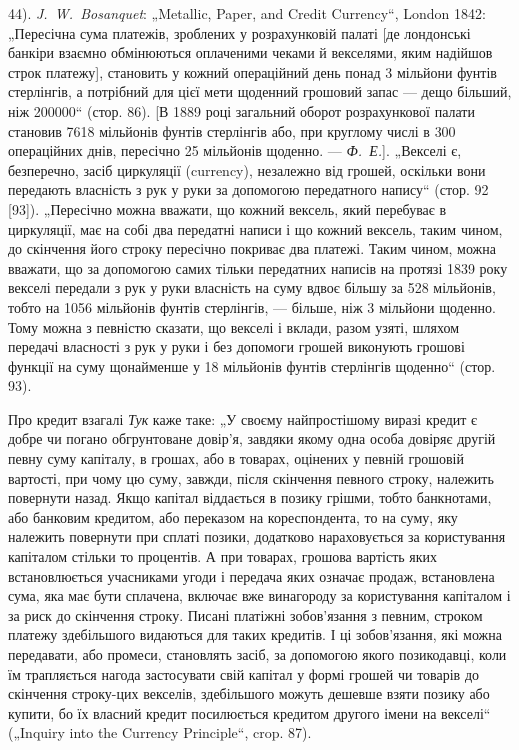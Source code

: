 \begin{small}
44). \emph{J.~W.~Bosanquet}: „Metallic, Paper, and Credit Currency“, London 1842: „Пересічна сума платежів,
зроблених у розрахунковій палаті [де лондонські банкіри взаємно обмінюються оплаченими чеками й
векселями, яким надійшов строк платежу], становить у кожний операційний день понад 3 мільйони фунтів
стерлінгів, а потрібний для цієї мети щоденний грошовий запас — дещо більший,
ніж \num{200000}“ (стор. 86). [В 1889 році загальний оборот розрахункової палати
становив 7618 мільйонів фунтів стерлінгів або, при круглому числі в 300 операційних днів,
пересічно 25 мільйонів щоденно. — \emph{Ф.~Е.}]. „Векселі є, безперечно, засіб циркуляції (currency),
незалежно від грошей,
оскільки вони передають власність з рук у руки за допомогою передатного
напису“ (стор. 92 [93]). „Пересічно можна вважати, що кожний вексель,
який перебуває в циркуляції, має на собі два передатні написи і що кожний
вексель, таким чином, до скінчення його строку пересічно покриває два
платежі. Таким чином, можна вважати, що за допомогою самих тільки передатних
написів на протязі 1839 року векселі передали з рук у руки власність
на суму вдвоє більшу за 528 мільйонів, тобто на 1056 мільйонів фунтів стерлінгів,
— більше, ніж 3 мільйони щоденно. Тому можна з певністю сказати, що
векселі і вклади, разом узяті, шляхом передачі власності з рук у руки і без
допомоги грошей виконують грошові функції на суму щонайменше у 18 мільйонів
фунтів стерлінгів щоденно“ (стор. 93).

Про кредит взагалі \emph{Тук} каже таке: „У своєму найпростішому виразі кредит
є добре чи погано обгрунтоване довір’я, завдяки якому одна особа довіряє
другій певну суму капіталу, в грошах, або в товарах, оцінених у певній грошовій
вартості, при чому цю суму, завжди, після скінчення певного строку, належить
повернути назад. Якщо капітал віддається в позику грішми, тобто банкнотами,
або банковим кредитом, або переказом на кореспондента, то на суму, яку
належить повернути при сплаті позики, додатково нараховується за користування
капіталом стільки то процентів. А при товарах, грошова вартість яких встановлюється
учасниками угоди і передача яких означає продаж, встановлена сума,
яка має бути сплачена, включає вже винагороду за користування капіталом
і за риск до скінчення строку. Писані платіжні зобов’язання з певним, строком
платежу здебільшого видаються для таких кредитів. І ці зобов’язання, які
можна передавати, або промеси, становлять засіб, за допомогою якого позикодавці,
коли їм трапляється нагода застосувати свій капітал у формі грошей чи
товарів до скінчення строку-цих векселів, здебільшого можуть дешевше взяти
позику або купити, бо їх власний кредит посилюється кредитом другого імени
на векселі“ („Inquiry into the Currency Principle“, crop. 87).


\end{small}
